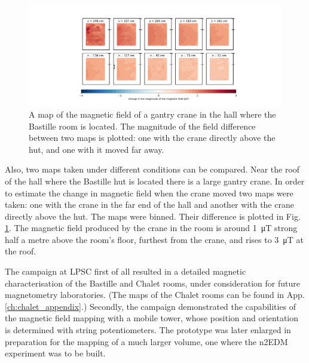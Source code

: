 \begin{figure}
  \centering
  \includegraphics[width=\linewidth]{gfx/mapping/lpsc/bastille_crane_change_magnitude_crop.pdf}
  \caption{A map of the magnetic field of a gantry crane in the hall where the Bastille room is located.
  The magnitude of the field difference between two maps is plotted: one with the crane directly above the hut, and one with it moved far away.}\label{fig:mapping_bastille_crane_change}
\end{figure}

Also, two maps taken under different conditions can be compared.
Near the roof of the hall where the Bastille hut is located there is a large gantry crane.
In order to estimate the change in magnetic field when the crane moved two maps were taken: one with the crane in the far end of the hall and another with the crane directly above the hut.
The maps were binned.
Their difference is plotted in Fig.\,\ref{fig:mapping_bastille_crane_change}.
The magnetic field produced by the crane in the room is around \SI{1}{\micro\tesla} strong half a metre above the room's floor, furthest from the crane, and rises to \SI{3}{\micro\tesla} at the roof.

The campaign at LPSC first of all resulted in a detailed magnetic characterisation of the Bastille and Chalet rooms, under consideration for future magnetometry laboratories.
(The maps of the Chalet rooms can be found in App.\,\ref{ch:chalet_appendix}.)
Secondly, the campaign demonstrated the capabilities of the magnetic field mapping with a mobile tower, whose position and orientation is determined with string potentiometers.
The prototype was later enlarged in preparation for the mapping of a much larger volume, one where the n2EDM experiment was to be built.




